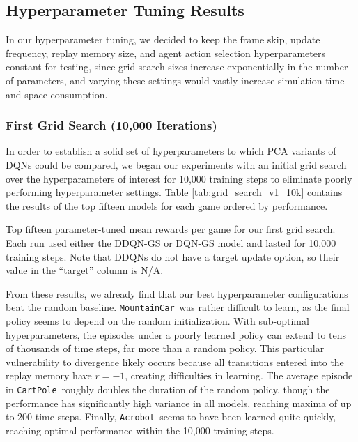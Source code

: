 \documentclass[11pt]{article}
\newcommand{\cp}{\texttt{CartPole}}
\newcommand{\ab}{\texttt{Acrobot}}
\newcommand{\mc}{\texttt{MountainCar}}
\begin{document}


\subsection{Hyperparameter Tuning Results}

In our hyperparameter tuning, we decided to keep the frame skip, update frequency, replay memory size, and agent action selection hyperparameters constant for testing, since grid search sizes increase exponentially in the number of parameters, and varying these settings would vastly increase simulation time and space consumption. 

\subsubsection{First Grid Search (10,000 Iterations)}

In order to establish a solid set of hyperparameters to which PCA variants of DQNs could be compared, we began our experiments with an initial grid search over the hyperparameters of interest for 10,000 training steps to eliminate poorly performing hyperparameter settings. Table \ref{tab:grid_search_v1_10k} contains the results of the top fifteen models for each game ordered by performance.

\begin{table}[!ht]
    \footnotesize
    \centering
    
    
    \caption{Top fifteen parameter-tuned mean rewards per game for our first grid search. Each run used either the DDQN-GS or DQN-GS model and lasted for 10,000 training steps. Note that DDQNs do not have a target update option, so their value in the ``target'' column is N/A.}
    \label{tab:grid_search_v1_10k}
\end{table}

From these results, we already find that our best hyperparameter configurations beat the random baseline. \mc~was rather difficult to learn, as the final policy seems to depend on the random initialization. With sub-optimal hyperparameters, the episodes under a poorly learned policy can extend to tens of thousands of time steps, far more than a random policy. This particular vulnerability to divergence likely occurs because all transitions entered into the replay memory have $r = -1$, creating difficulties in learning. The average episode in \cp~roughly doubles the duration of the random policy, though the performance has significantly high variance in all models, reaching maxima of up to 200 time steps. Finally, \ab~seems to have been learned quite quickly, reaching optimal performance within the 10,000 training steps.
\end{document}
